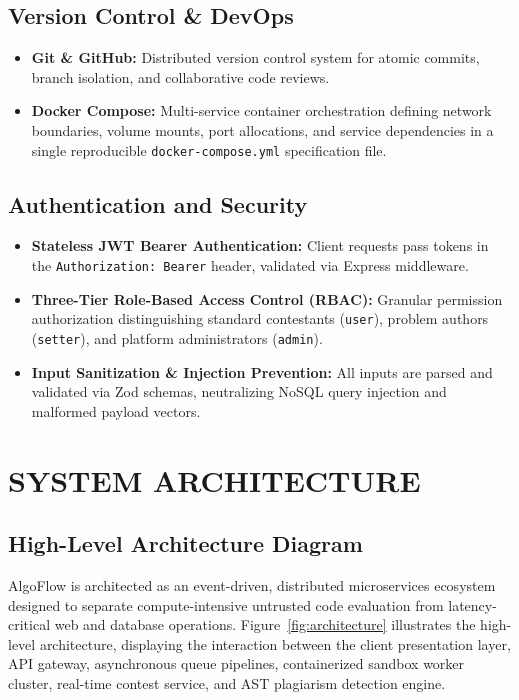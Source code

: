 \documentclass[12pt,a4paper]{report}
\begin{document}
\section{Version Control \& DevOps}
\begin{itemize}[leftmargin=*]
  \item \textbf{Git \& GitHub:} Distributed version control system for atomic commits, branch isolation, and collaborative code reviews.
  \item \textbf{Docker Compose:} Multi-service container orchestration defining network boundaries, volume mounts, port allocations, and service dependencies in a single reproducible \texttt{docker-compose.yml} specification file.
\end{itemize}

\section{Authentication and Security}
\begin{itemize}[leftmargin=*]
  \item \textbf{Stateless JWT Bearer Authentication:} Client requests pass tokens in the \texttt{Authorization: Bearer} header, validated via Express middleware.
  \item \textbf{Three-Tier Role-Based Access Control (RBAC):} Granular permission authorization distinguishing standard contestants (\texttt{user}), problem authors (\texttt{setter}), and platform administrators (\texttt{admin}).
  \item \textbf{Input Sanitization \& Injection Prevention:} All inputs are parsed and validated via Zod schemas, neutralizing NoSQL query injection and malformed payload vectors.
\end{itemize}

\clearpage


\chapter{SYSTEM ARCHITECTURE}

\section{High-Level Architecture Diagram}
AlgoFlow is architected as an event-driven, distributed microservices ecosystem designed to separate compute-intensive untrusted code evaluation from latency-critical web and database operations. Figure~\ref{fig:architecture} illustrates the high-level architecture, displaying the interaction between the client presentation layer, API gateway, asynchronous queue pipelines, containerized sandbox worker cluster, real-time contest service, and AST plagiarism detection engine.
\end{document}
